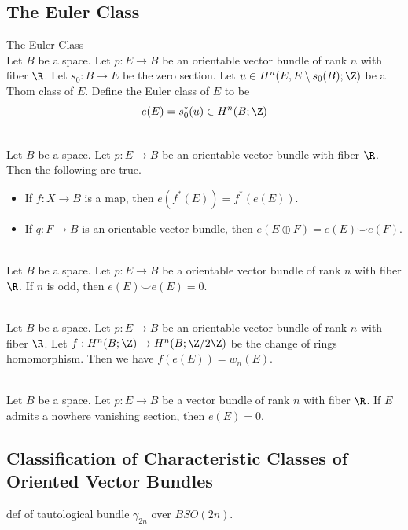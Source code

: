\documentclass[a4paper]{article}
\begin{document}
\subsection{The Euler Class}
\begin{defn}{The Euler Class}{}\\
Let $B$ be a space. Let $p:E\to B$ be an orientable vector bundle of rank $n$ with fiber $\R$. Let $s_0:B\to E$ be the zero section. Let $u\in H^n(E,E\setminus s_0(B);\Z)$ be a Thom class of $E$. Define the Euler class of $E$ to be $$e(E)=s_0^\ast(u)\in H^n(B;\Z)$$
\end{defn}

\begin{prp}{}{}\\
Let $B$ be a space. Let $p:E\to B$ be an orientable vector bundle with fiber $\R$. Then the following are true. 
\begin{itemize}
\item If $f:X\to B$ is a map, then $e(f^\ast(E))=f^\ast(e(E))$. 
\item If $q:F\to B$ is an orientable vector bundle, then $e(E\oplus F)=e(E)\smile e(F)$. 
\end{itemize}
\end{prp}

\begin{crl}{}{}\\
Let $B$ be a space. Let $p:E\to B$ be a orientable vector bundle of rank $n$ with fiber $\R$. If $n$ is odd, then $e(E)\smile e(E)=0$. 
\end{crl}

\begin{prp}{}{}\\
Let $B$ be a space. Let $p:E\to B$ be an orientable vector bundle of rank $n$ with fiber $\R$. Let $f:H^n(B;\Z)\to H^n(B;\Z/2\Z)$ be the change of rings homomorphism. Then we have $f(e(E))=w_n(E)$. 
\end{prp}

\begin{prp}{}{}\\
Let $B$ be a space. Let $p:E\to B$ be a vector bundle of rank $n$ with fiber $\R$. If $E$ admits a nowhere vanishing section, then $e(E)=0$. 
\end{prp}

\subsection{Classification of Characteristic Classes of Oriented Vector Bundles}
def of tautological bundle $\gamma_{2n}$ over $BSO(2n)$. 
\end{document}
